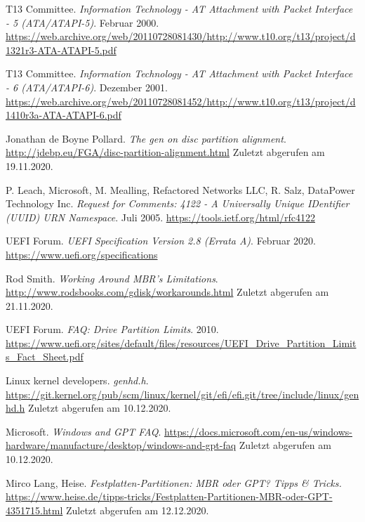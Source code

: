 \begin{thebibliography}{99}
        T13 Committee.
        \textit{Information Technology - AT Attachment with Packet Interface - 5 (ATA/ATAPI-5)}.
        Februar 2000.
        \url{https://web.archive.org/web/20110728081430/http://www.t10.org/t13/project/d1321r3-ATA-ATAPI-5.pdf}

        T13 Committee.
        \textit{Information Technology - AT Attachment with Packet Interface - 6 (ATA/ATAPI-6)}.
        Dezember 2001.
        \url{https://web.archive.org/web/20110728081452/http://www.t10.org/t13/project/d1410r3a-ATA-ATAPI-6.pdf}

        Jonathan de Boyne Pollard.
        \textit{The gen on disc partition alignment}.
        \url{http://jdebp.eu/FGA/disc-partition-alignment.html}
        Zuletzt abgerufen am 19.11.2020.

        P. Leach, Microsoft, M. Mealling, Refactored Networks LLC, R. Salz, DataPower Technology Inc.
        \textit{Request for Comments: 4122 - A Universally Unique IDentifier (UUID) URN Namespace}.
        Juli 2005.
        \url{https://tools.ietf.org/html/rfc4122}

        UEFI Forum.
        \textit{UEFI Specification Version 2.8 (Errata A)}.
        Februar 2020.
        \url{https://www.uefi.org/specifications}

        Rod Smith.
        \textit{Working Around MBR's Limitations}.
        \url{http://www.rodsbooks.com/gdisk/workarounds.html}
        Zuletzt abgerufen am 21.11.2020.

        UEFI Forum.
        \textit{FAQ: Drive Partition Limits}.
        2010.
        \url{https://www.uefi.org/sites/default/files/resources/UEFI_Drive_Partition_Limits_Fact_Sheet.pdf}


        Linux kernel developers.
        \textit{genhd.h}.
        \url{https://git.kernel.org/pub/scm/linux/kernel/git/efi/efi.git/tree/include/linux/genhd.h}
        Zuletzt abgerufen am 10.12.2020.

        Microsoft.
        \textit{Windows and GPT FAQ}.
        \url{https://docs.microsoft.com/en-us/windows-hardware/manufacture/desktop/windows-and-gpt-faq}
        Zuletzt abgerufen am 10.12.2020.

        Mirco Lang, Heise.
        \textit{Festplatten-Partitionen: MBR oder GPT? Tipps \& Tricks.}
        \url{https://www.heise.de/tipps-tricks/Festplatten-Partitionen-MBR-oder-GPT-4351715.html}
        Zuletzt abgerufen am 12.12.2020.


\end{thebibliography}
